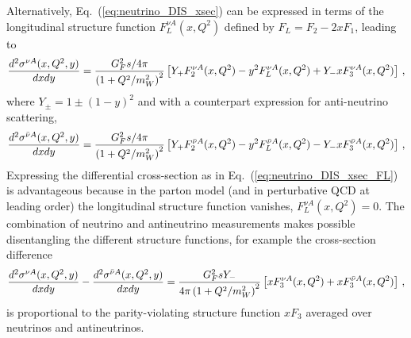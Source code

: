 \documentclass[11pt,a4paper]{article}
\newcommand{\be}{\begin{equation}}
\newcommand{\ee}{\end{equation}}
\newcommand{\lc}{\left[}
\newcommand{\rc}{\right]}
\newcommand{\lp}{\left(}
\newcommand{\rp}{\right)}
\def\frac#1#2{{{#1}\over {#2}}}
\numberwithin{equation}{section}
\numberwithin{figure}{section}
\numberwithin{table}{section}
\begin{document}
Alternatively, Eq.~(\ref{eq:neutrino_DIS_xsec}) can be expressed in terms
of the longitudinal structure function  $F_L^{\nu A}(x,Q^2)$ defined
by $F_L = F_2-2xF_1$, leading to
\be
\label{eq:neutrino_DIS_xsec_FL}
\frac{d^2\sigma^{\nu A}(x,Q^2,y)}{dxdy} =  \frac{G_F^2s/4\pi}{\lp 1+Q^2/m_W^2\rp^2}\lc Y_+F^{\nu A}_2(x,Q^2) - y^2F^{\nu A}_L(x,Q^2) +Y_- xF^{\nu A}_3(x,Q^2)\rc  \, ,
\ee
where $Y_\pm = 1 \pm (1-y)^2$ and with a counterpart expression for anti-neutrino scattering,
\be
\label{eq:antineutrino_DIS_xsec_FL}
\frac{d^2\sigma^{\bar{\nu} A}(x,Q^2,y)}{dxdy} =  \frac{G_F^2s/4\pi}{\lp 1+Q^2/m_W^2\rp^2}\lc Y_+F^{\bar{\nu} A}_2(x,Q^2) - y^2F^{\bar{\nu} A}_L(x,Q^2) -Y_- xF^{\bar{\nu} A}_3(x,Q^2)\rc  \, ,
\ee
%
Expressing the differential cross-section as in Eq.~(\ref{eq:neutrino_DIS_xsec_FL}) is advantageous
because in the parton model (and in perturbative QCD at leading order) the longitudinal
structure function vanishes, $F_L^{\nu A}(x,Q^2)=0$.
%
The combination of neutrino and antineutrino measurements makes possible disentangling
the different structure functions, for example the cross-section difference
\be
\label{eq:neutrino_DIS_xsec_FL_diff}
\frac{d^2\sigma^{\nu A}(x,Q^2,y)}{dxdy} - \frac{d^2\sigma^{\bar{\nu} A}(x,Q^2,y)}{dxdy}=  \frac{G_F^2s Y_-}
{4\pi \lp 1+Q^2/m_W^2\rp^2}\lc    xF^{\nu A}_3(x,Q^2)+  xF^{\bar{\nu} A}_3(x,Q^2)\rc \, ,
\ee
is proportional to the parity-violating structure function $xF_3$ averaged over neutrinos
and antineutrinos.
\end{document}
